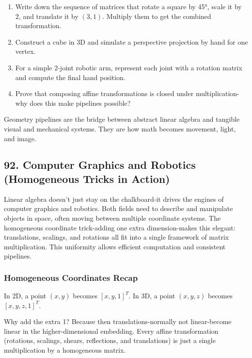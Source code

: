 \documentclass[
  letterpaper,
  DIV=11,
  numbers=noendperiod]{scrreprt}
\providecommand{\tightlist}{%
  \setlength{\itemsep}{0pt}\setlength{\parskip}{0pt}}
\begin{document}
\begin{enumerate}
\def\labelenumi{\arabic{enumi}.}
\tightlist
\item
  Write down the sequence of matrices that rotate a square by 45°, scale
  it by 2, and translate it by \((3, 1)\). Multiply them to get the
  combined transformation.
\item
  Construct a cube in 3D and simulate a perspective projection by hand
  for one vertex.
\item
  For a simple 2-joint robotic arm, represent each joint with a rotation
  matrix and compute the final hand position.
\item
  Prove that composing affine transformations is closed under
  multiplication-why does this make pipelines possible?
\end{enumerate}

Geometry pipelines are the bridge between abstract linear algebra and
tangible visual and mechanical systems. They are how math becomes
movement, light, and image.

\subsection{92. Computer Graphics and Robotics (Homogeneous Tricks in
Action)}\label{computer-graphics-and-robotics-homogeneous-tricks-in-action}

Linear algebra doesn't just stay on the chalkboard-it drives the engines
of computer graphics and robotics. Both fields need to describe and
manipulate objects in space, often moving between multiple coordinate
systems. The homogeneous coordinate trick-adding one extra
dimension-makes this elegant: translations, scalings, and rotations all
fit into a single framework of matrix multiplication. This uniformity
allows efficient computation and consistent pipelines.

\subsubsection{Homogeneous Coordinates
Recap}\label{homogeneous-coordinates-recap}

In 2D, a point \((x, y)\) becomes \([x, y, 1]^T\). In 3D, a point
\((x, y, z)\) becomes \([x, y, z, 1]^T\).

Why add the extra 1? Because then translations-normally not
linear-become linear in the higher-dimensional embedding. Every affine
transformation (rotations, scalings, shears, reflections, and
translations) is just a single multiplication by a homogeneous matrix.
\end{document}
